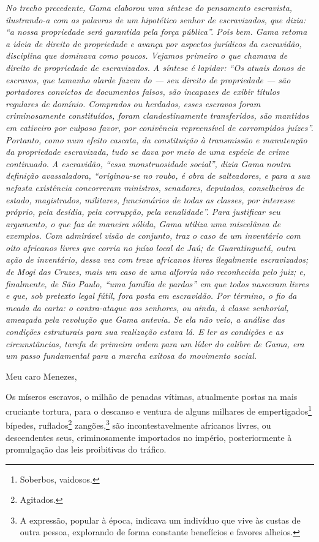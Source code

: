 {\begin{resumo}
\emph{No trecho precedente, Gama elaborou uma síntese do pensamento
escravista, ilustrando-a com as palavras de um hipotético senhor de
escravizados, que dizia: ``a nossa propriedade será garantida pela força
pública''. Pois bem. Gama retoma a ideia de direito de propriedade e
avança por aspectos jurídicos da escravidão, disciplina que dominava
como poucos. Vejamos primeiro o que chamava de direito de propriedade de
escravizados. A síntese é lapidar: ``Os atuais donos de escravos, que
tamanho alarde fazem do --- seu direito de propriedade --- são portadores
convictos de documentos falsos, são incapazes de exibir títulos
regulares de domínio. Comprados ou herdados, esses escravos foram
criminosamente constituídos, foram clandestinamente transferidos, são
mantidos em cativeiro por culposo favor, por conivência repreensível de
corrompidos juízes''. Portanto, como num efeito cascata, da constituição
à transmissão e manutenção da propriedade escravizada, tudo se dava por
meio de uma espécie de crime continuado. A escravidão, ``essa
monstruosidade social'', dizia Gama noutra definição avassaladora,
``originou-se no roubo, é obra de salteadores, e para a sua nefasta
existência concorreram ministros, senadores, deputados, conselheiros de
estado, magistrados, militares, funcionários de todas as classes, por
interesse próprio, pela desídia, pela corrupção, pela venalidade''. Para
justificar seu argumento, o que faz de maneira sólida, Gama utiliza uma
miscelânea de exemplos. Com admirável visão de conjunto, traz o caso de
um inventário com oito africanos livres que corria no juízo local de
Jaú; de Guaratinguetá, outra ação de inventário, dessa vez com treze
africanos livres ilegalmente escravizados; de Mogi das Cruzes, mais um
caso de uma alforria não reconhecida pelo juiz; e, finalmente, de São
Paulo, ``uma família de pardos'' em que todos nasceram livres e que, sob
pretexto legal fútil, fora posta em escravidão. Por término, o fio da
meada da carta: o contra-ataque aos senhores, ou ainda, à classe
senhorial, ameaçada pela revolução que Gama antevia. Se ela
não veio, a análise das condições estruturais para sua realização estava lá. E ler as condições e as circunstâncias, tarefa de
primeira ordem para um líder do calibre de Gama, era um passo
fundamental para a marcha exitosa do movimento social.}
\end{resumo}

Meu caro Menezes,

Os míseros escravos, o milhão de penadas vítimas, atualmente postas na
mais cruciante tortura, para o descanso e ventura de alguns milhares de
empertigados\footnote{Soberbos, vaidosos.} bípedes, ruflados\footnote{
  Agitados.} zangões,\footnote{A expressão, popular à época, indicava
  um indivíduo que vive às custas de outra pessoa, explorando de forma
  constante benefícios e favores alheios.} são incontestavelmente
africanos livres, ou descendentes seus, criminosamente importados no
império, posteriormente à promulgação das leis proibitivas do tráfico.

}
